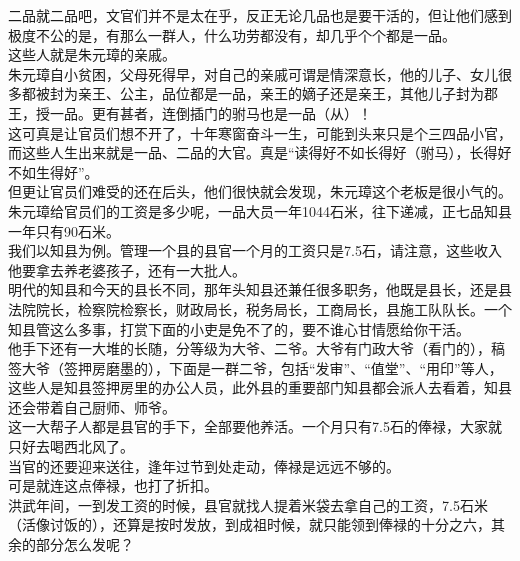 \begin{multicols}{\theparacolNo}
二品就二品吧，文官们并不是太在乎，反正无论几品也是要干活的，但让他们感到极度不公的是，有那么一群人，什么功劳都没有，却几乎个个都是一品。\\

这些人就是朱元璋的亲戚。\\

朱元璋自小贫困，父母死得早，对自己的亲戚可谓是情深意长，他的儿子、女儿很多都被封为亲王、公主，品位都是一品，亲王的嫡子还是亲王，其他儿子封为郡王，授一品。更有甚者，连倒插门的驸马也是一品（从）！\\

这可真是让官员们想不开了，十年寒窗奋斗一生，可能到头来只是个三四品小官，而这些人生出来就是一品、二品的大官。真是“读得好不如长得好（驸马），长得好不如生得好”。\\

但更让官员们难受的还在后头，他们很快就会发现，朱元璋这个老板是很小气的。\\

朱元璋给官员们的工资是多少呢，一品大员一年1044石米，往下递减，正七品知县一年只有90石米。\\

我们以知县为例。管理一个县的县官一个月的工资只是7.5石，请注意，这些收入他要拿去养老婆孩子，还有一大批人。\\

明代的知县和今天的县长不同，那年头知县还兼任很多职务，他既是县长，还是县法院院长，检察院检察长，财政局长，税务局长，工商局长，县施工队队长。一个知县管这么多事，打赏下面的小吏是免不了的，要不谁心甘情愿给你干活。\\

他手下还有一大堆的长随，分等级为大爷、二爷。大爷有门政大爷（看门的），稿签大爷（签押房磨墨的），下面是一群二爷，包括“发审”、“值堂”、“用印”等人，这些人是知县签押房里的办公人员，此外县的重要部门知县都会派人去看着，知县还会带着自己厨师、师爷。\\

这一大帮子人都是县官的手下，全部要他养活。一个月只有7.5石的俸禄，大家就只好去喝西北风了。\\

当官的还要迎来送往，逢年过节到处走动，俸禄是远远不够的。\\

可是就连这点俸禄，也打了折扣。\\

洪武年间，一到发工资的时候，县官就找人提着米袋去拿自己的工资，7.5石米（活像讨饭的），还算是按时发放，到成祖时候，就只能领到俸禄的十分之六，其余的部分怎么发呢？\\


\end{multicols}

